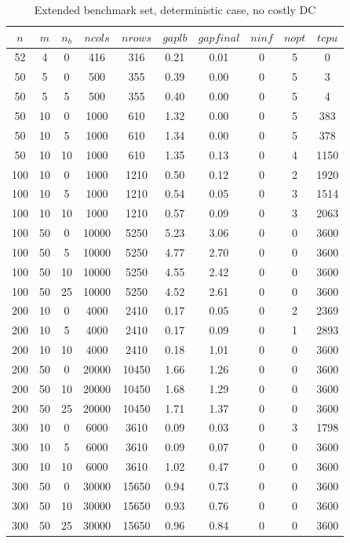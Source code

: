 \documentclass[mnsc,sglanonrev]{informs4}  %
\theoremstyle{remark}\newtheorem{remark}{Remark}
\begin{document}
\begin{APPENDICES}
\begin{table}
	\centering
	\renewcommand{\arraystretch}{1}
	\begin{tabular}{cccccccccc}
		$n$ & $m$ & $n_b$ & $ncols$ & $nrows$ & $gaplb$ & $gapfinal$ & $ninf$ & $nopt$ & $tcpu$\\
		\hline
		52 &  4 &  0 &   416 &   316 & 0.21 & 0.01 & 0 & 5 &    0  \\
		\hline
		50 &  5 &  0 &   500 &   355 & 0.39 & 0.00 & 0 & 5 &    3  \\
		50 &  5 &  5 &   500 &   355 & 0.40 & 0.00 & 0 & 5 &    4  \\
		50 & 10 &  0 &  1000 &   610 & 1.32 & 0.00 & 0 & 5 &  383  \\
		50 & 10 &  5 &  1000 &   610 & 1.34 & 0.00 & 0 & 5 &  378  \\
		50 & 10 & 10 &  1000 &   610 & 1.35 & 0.13 & 0 & 4 & 1150  \\
		\hline
		100 & 10 &  0 &  1000 &  1210 & 0.50 & 0.12 & 0 & 2 & 1920  \\
		100 & 10 &  5 &  1000 &  1210 & 0.54 & 0.05 & 0 & 3 & 1514  \\
		100 & 10 & 10 &  1000 &  1210 & 0.57 & 0.09 & 0 & 3 & 2063  \\
		100 & 50 &  0 & 10000 &  5250 & 5.23 & 3.06 & 0 & 0 & 3600  \\
		100 & 50 &  5 & 10000 &  5250 & 4.77 & 2.70 & 0 & 0 & 3600  \\
		100 & 50 & 10 & 10000 &  5250 & 4.55 & 2.42 & 0 & 0 & 3600  \\
		100 & 50 & 25 & 10000 &  5250 & 4.52 & 2.61 & 0 & 0 & 3600  \\
		\hline
		200 & 10 &  0 &  4000 &  2410 & 0.17 & 0.05 & 0 & 2 & 2369  \\
		200 & 10 &  5 &  4000 &  2410 & 0.17 & 0.09 & 0 & 1 & 2893  \\
		200 & 10 & 10 &  4000 &  2410 & 0.18 & 1.01 & 0 & 0 & 3600  \\
		200 & 50 &  0 & 20000 & 10450 & 1.66 & 1.26 & 0 & 0 & 3600  \\
		200 & 50 & 10 & 20000 & 10450 & 1.68 & 1.29 & 0 & 0 & 3600  \\
		200 & 50 & 25 & 20000 & 10450 & 1.71 & 1.37 & 0 & 0 & 3600  \\
		\hline
		300 & 10 &  0 &  6000 &  3610 & 0.09 & 0.03 & 0 & 3 & 1798 \\
		300 & 10 &  5 &  6000 &  3610 & 0.09 & 0.07 & 0 & 0 & 3600 \\
		300 & 10 & 10 &  6000 &  3610 & 1.02 & 0.47 & 0 & 0 & 3600 \\
		300 & 50 &  0 & 30000 & 15650 & 0.94 & 0.73 & 0 & 0 & 3600  \\
		300 & 50 & 10 & 30000 & 15650 & 0.93 & 0.76 & 0 & 0 & 3600  \\
		300 & 50 & 25 & 30000 & 15650 & 0.96 & 0.84 & 0 & 0 & 3600  \\
		\hline
	\end{tabular}
	\caption{Extended benchmark set, deterministic case, no costly DC}
	\label{table:extset}
\end{table}


\end{APPENDICES}
\end{document}
